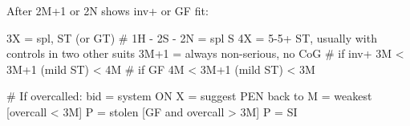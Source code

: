 After 2M+1 or 2N shows inv+ or GF fit:

3X = spl, ST (or GT)  # 1H - 2S - 2N = spl S
4X = 5-5+ ST, usually with controls in two other suits
3M+1 = always non-serious, no CoG
# if inv+
3M < 3M+1 (mild ST) < 4M
# if GF
4M < 3M+1 (mild ST) < 3M

# If overcalled:
bid = system ON
X = suggest PEN
back to M = weakest
[overcall < 3M] P = stolen
[GF and overcall > 3M] P = SI